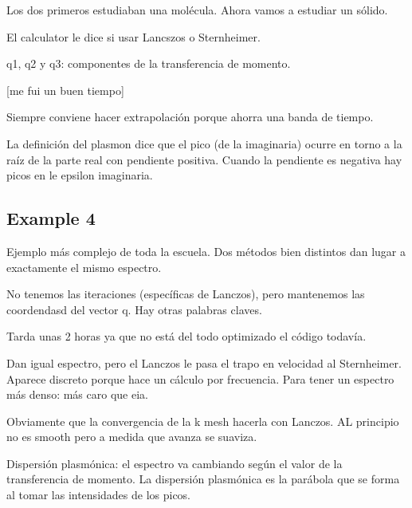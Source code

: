  Los dos primeros estudiaban una molécula. Ahora vamos a estudiar un sólido.

  El calculator le dice si usar Lancszos o Sternheimer.

  q1, q2 y q3: componentes de la transferencia de momento.

  [me fui un buen tiempo]

  Siempre conviene hacer extrapolación porque ahorra una banda de tiempo.

  La definición del plasmon dice que el pico (de la imaginaria) ocurre en torno a la raíz de la parte real con pendiente positiva. Cuando la pendiente es negativa hay picos en le epsilon imaginaria.

\subsection{Example 4}

  Ejemplo más complejo de toda la escuela. Dos métodos bien distintos dan lugar a exactamente el mismo espectro.

  No tenemos las iteraciones (específicas de Lanczos), pero mantenemos las coordendasd del vector q. Hay otras palabras claves.

  Tarda unas 2 horas ya que no está del todo optimizado el código todavía.

  Dan igual espectro, pero el Lanczos le pasa el trapo en velocidad al Sternheimer. Aparece discreto porque hace un cálculo por frecuencia. Para tener un espectro más denso: más caro que eia.

  Obviamente que la convergencia de la k mesh hacerla con Lanczos. AL principio no es smooth pero a medida que avanza se suaviza.

  Dispersión plasmónica: el espectro va cambiando según el valor de la transferencia de momento. La dispersión plasmónica es la parábola que se forma al tomar las intensidades de los picos.
